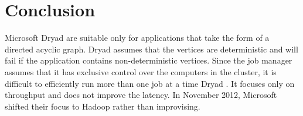 \documentclass[9pt,twocolumn,twoside]{../../styles/osajnl}
\begin{document}
\section{Conclusion}
Microsoft Dryad are suitable only for applications that take the form of a directed acyclic graph. Dryad assumes that the vertices are deterministic and will fail if the application contains non-deterministic vertices. Since the job manager assumes that it has exclusive control over the computers in the cluster, it is difficult to efficiently run more than one job at a time Dryad \cite{DryadMSR4}. It focuses only on throughput and does not improve the latency. In November 2012, Microsoft shifted their focus to Hadoop rather than improvising.  

\end{document}
